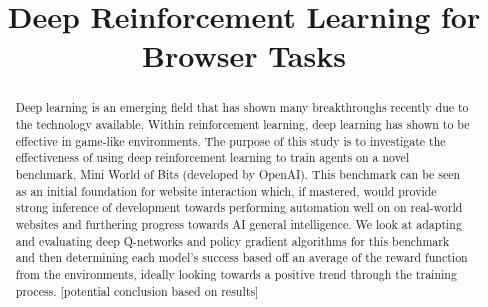 \documentclass[conference]{IEEEtran}
\begin{document}
%
\title{Deep Reinforcement Learning for Browser Tasks}


\author{
\and
{}
\and
{}
\and
{}
\and
{}

}








\maketitle

\begin{abstract}
Deep learning is an emerging field that has shown many breakthroughs recently due to the technology available. Within reinforcement learning, deep learning has shown to be effective in game-like environments. The purpose of this study is to investigate the effectiveness of using deep reinforcement learning to train agents on a novel benchmark, Mini World of Bits (developed by OpenAI). This benchmark can be seen as an initial foundation for website interaction which, if mastered, would provide strong inference of development towards performing automation well on on real-world websites and furthering progress towards AI general intelligence. We look at adapting and evaluating deep Q-networks and policy gradient algorithms for this benchmark and then determining each model's success based off an average of the reward function from the environments, ideally looking towards a positive trend through the training process. [potential conclusion based on results]
\end{abstract}
\end{document}
